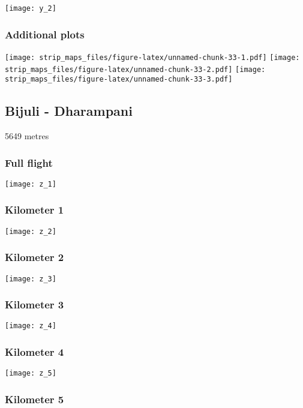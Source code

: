 \documentclass[]{article}
\begin{document}
\texttt{[image: y\_2]}

\subsubsection{Additional plots}\label{additional-plots-24}

\texttt{[image: strip\_maps\_files/figure-latex/unnamed-chunk-33-1.pdf]}
\texttt{[image: strip\_maps\_files/figure-latex/unnamed-chunk-33-2.pdf]}
\texttt{[image: strip\_maps\_files/figure-latex/unnamed-chunk-33-3.pdf]}

\newpage

\subsection{Bijuli - Dharampani}\label{bijuli---dharampani}

5649 metres

\subsubsection{Full flight}\label{full-flight-25}

\texttt{[image: z\_1]}

\subsubsection{Kilometer 1}\label{kilometer-1-25}

\texttt{[image: z\_2]}

\subsubsection{Kilometer 2}\label{kilometer-2-25}

\texttt{[image: z\_3]}

\subsubsection{Kilometer 3}\label{kilometer-3-25}

\texttt{[image: z\_4]}

\subsubsection{Kilometer 4}\label{kilometer-4-24}

\texttt{[image: z\_5]}

\subsubsection{Kilometer 5}\label{kilometer-5-20}
\end{document}
